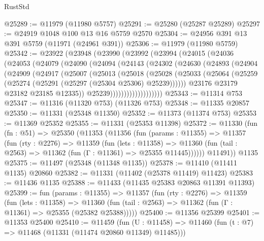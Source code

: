 \begin{lexlean}{RustStd}
\begin{coremodule}
@25289 := @11979 (@11980 @5757)
@25291 := @25280 (@25287 @25289)
@25297 := @24919 @1048 @100 @13 @16 @5759 @2570
@25304 := @24956 @391 @13 @391 @5759 (@11971 (@24961 @391))
@25306 := @11979 (@11980 @5759)
@25342 := @23922
    (@23948
      (@23990
        (@23992
          (@23994
            (@24015
              (@24036
                (@24053
                  (@24079
                    (@24090
                      (@24094
                        (@24143
                          (@24302
                            (@24630
                              (@24893
                                (@24904
                                  (@24909
                                    (@24917
                                      (@25007
                                        (@25013
                                          (@25018
                                            (@25028
                                              (@25033
                                                (@25064
                                                  (@25259
                                                    (@25274
                                                      (@25291 (@25297 (@25304 @25306) @25239))))))
                                              @23176
                                              @23179
                                              @23182
                                              @23185
                                              @12335))
                                          @25239)))))))))))))))))))
@25343 := @11314 @753
@25347 := @11316 (@11320 @753) (@11326 @753)
@25348 := @11335 @20857
@25350 := @11331 (@25348 @11350)
@25352 := @11373 (@11374 @753)
@25353 := @11369 @25352
@25355 := @11331 (@25353 @11398)
@25372 := @11330
    (fun (fn : @51) =>
    @25350
      (@11353
        (@11356
          (fun (params : @11355) =>
          @11357
            (fun (rty : @2276) =>
            @11359
              (fun (lets : @11358) =>
              @11360 (fun (tail : @2563) => @11362 (fun (Γ : @11361) => @25355 @11445))))))
        @11491))
    @1135
@25375 := @11497 (@25348 (@11348 @1135))
@25378 := @11410 (@11411 @1135) @20860
@25382 := @11331 (@11402 (@25378 @11419) @11423)
@25383 := @11436 @1135
@25388 := @11433 (@11435 @25383 @20863 @11391 @11393)
@25399 := fun (params : @11355) =>
  @11357
    (fun (rty : @2276) =>
    @11359
      (fun (lets : @11358) =>
      @11360 (fun (tail : @2563) => @11362 (fun (Γ : @11361) => @25355 (@25382 @25388)))))
@25400 := @11356 @25399
@25401 := @11353 @25400
@25410 := @11459
    (fun (U : @11458) => @11460 (fun (t : @7) => @11468 (@11331 (@11474 @20860 @11349) @11485)))

\end{coremodule}
\end{lexlean}
